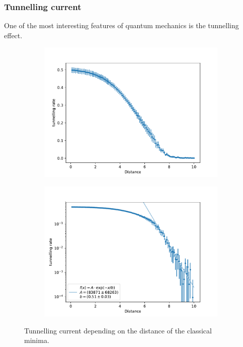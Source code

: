 \documentclass{scrartcl}
\begin{document}
	\subsubsection{Tunnelling current}
		One of the most interesting features of quantum mechanics is the tunnelling effect.
		\begin{figure}[H]
			\centering
			\begin{subfigure}[c]{0.49\textwidth}
				\includegraphics[width=\textwidth]{../imgs/anharmonic_oscillator_lambda_parameter/track_100001000_tunnelling_current.pdf}
				\label{fig:anharmonic_oscillator_tunnelling_current_a}
			\end{subfigure}
			\begin{subfigure}[c]{0.49\textwidth}
				\includegraphics[width=\textwidth]{../imgs/anharmonic_oscillator_lambda_parameter/track_100001000_tunnelling_current_log_fit.pdf}
				\label{fig:anharmonic_oscillator_tunnelling_current_b}
			\end{subfigure}
			\caption{Tunnelling current depending on the distance of the classical minima.}
			\label{fig:anharmonic_oscillator_tunnelling_current}
		\end{figure}
\end{document}
